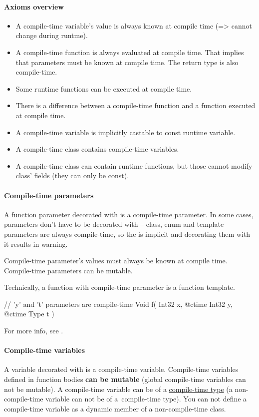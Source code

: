 \paragraph{Axioms overview}
\begin{itemize}
	\item A compile-time variable's value is always known at compile time (=> cannot change during runtme).
	\item A compile-time function is always evaluated at compile time. That implies that parameters must be known at compile time. The return type is also compile-time.
	\item Some runtime functions can be executed at compile time.
	\item There is a difference between a compile-time function and a function executed at compile time.
	\item A compile-time variable is implicitly castable to const runtime variable.
	\item A compile-time class contains compile-time variables.
	\item A compile-time class can contain runtime functions, but those cannot modify class' fields (they can only be const).
\end{itemize}

\paragraph{Compile-time parameters}
A function parameter decorated with  is a compile-time parameter. In some cases, parameters don't have to be decorated with  -- class, enum and template parameters are always compile-time, so the  is implicit and decorating them with it results in warning.

Compile-time parameter's values must always be known at compile time. Compile-time parameters can be mutable.

Technically, a function with compile-time parameter is a function template.

\begin{code}
// 'y' and 't' parameters are compile-time
Void f( Int32 x, @ctime Int32 y, @ctime Type t ) {
	
}
\end{code}

For more info, see .

\paragraph{Compile-time variables}
A variable decorated with  is a compile-time variable. Compile-time variables defined in function bodies \textbf{can be mutable} (global compile-time variables can not be mutable). A compile-time variable can be of a \hyperref[ctime:class]{compile-time type} (a non-compile-time variable can not be of a~compile-time type). You can not define a compile-time variable as a dynamic member of a non-compile-time class.


